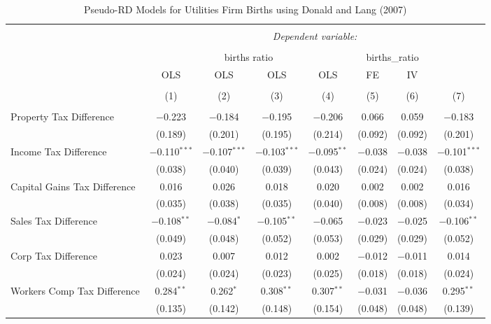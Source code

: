 
\begin{table}[!htbp] \centering 
  \caption{Pseudo-RD Models for  Utilities Firm Births using Donald and Lang (2007)} 
  \label{} 
\begin{tabular}{@{\extracolsep{5pt}}lccccccc} 
\\[-1.8ex]\hline 
\hline \\[-1.8ex] 
 & \multicolumn{7}{c}{\textit{Dependent variable:}} \\ 
\cline{2-8} 
\\[-1.8ex] & \multicolumn{4}{c}{births ratio} & \multicolumn{2}{c}{births\_ratio} &   \\ 
 & OLS & OLS & OLS & OLS & FE & IV &  \\ 
\\[-1.8ex] & (1) & (2) & (3) & (4) & (5) & (6) & (7)\\ 
\hline \\[-1.8ex] 
 Property Tax Difference & $-$0.223 & $-$0.184 & $-$0.195 & $-$0.206 & 0.066 & 0.059 & $-$0.183 \\ 
  & (0.189) & (0.201) & (0.195) & (0.214) & (0.092) & (0.092) & (0.201) \\ 
  Income Tax Difference & $-$0.110$^{***}$ & $-$0.107$^{***}$ & $-$0.103$^{***}$ & $-$0.095$^{**}$ & $-$0.038 & $-$0.038 & $-$0.101$^{***}$ \\ 
  & (0.038) & (0.040) & (0.039) & (0.043) & (0.024) & (0.024) & (0.038) \\ 
  Capital Gains Tax Difference & 0.016 & 0.026 & 0.018 & 0.020 & 0.002 & 0.002 & 0.016 \\ 
  & (0.035) & (0.038) & (0.035) & (0.040) & (0.008) & (0.008) & (0.034) \\ 
  Sales Tax Difference & $-$0.108$^{**}$ & $-$0.084$^{*}$ & $-$0.105$^{**}$ & $-$0.065 & $-$0.023 & $-$0.025 & $-$0.106$^{**}$ \\ 
  & (0.049) & (0.048) & (0.052) & (0.053) & (0.029) & (0.029) & (0.052) \\ 
  Corp Tax Difference & 0.023 & 0.007 & 0.012 & 0.002 & $-$0.012 & $-$0.011 & 0.014 \\ 
  & (0.024) & (0.024) & (0.023) & (0.025) & (0.018) & (0.018) & (0.024) \\ 
  Workers Comp Tax Difference & 0.284$^{**}$ & 0.262$^{*}$ & 0.308$^{**}$ & 0.307$^{**}$ & $-$0.031 & $-$0.036 & 0.295$^{**}$ \\ 
  & (0.135) & (0.142) & (0.148) & (0.154) & (0.048) & (0.048) & (0.139) \\ 

\end{tabular}
\end{table}
